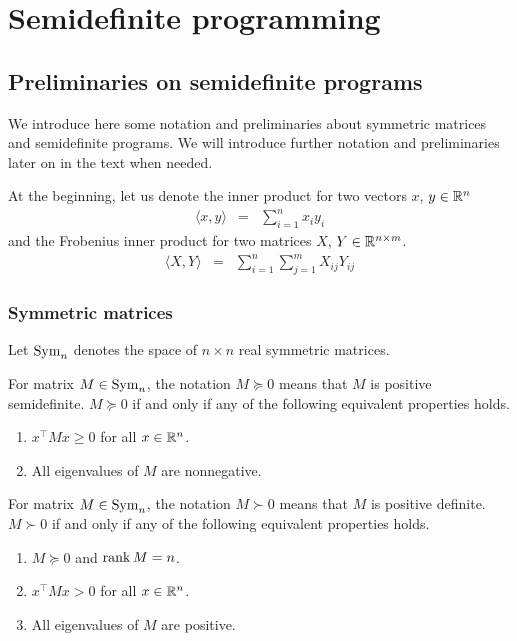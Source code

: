 \chapter{Semidefinite programming}

\section{Preliminaries on semidefinite programs}
We introduce here some notation and preliminaries about symmetric matrices and semidefinite programs.
We will introduce further notation and preliminaries later on in the text when needed.

At the beginning, let us denote the inner product for two vectors $x$, $y \in\mathbb{R}^n$
\begin{eqnarray}
  \langle x, y\rangle &=& \sum_{i=1}^n x_iy_i
\end{eqnarray}
and the Frobenius inner product for two matrices $X$, $Y\in\mathbb{R}^{n\times m}$.
\begin{eqnarray}
  \langle X, Y\rangle &=& \sum_{i=1}^n \sum_{j=1}^m X_{ij}Y_{ij}
\end{eqnarray}

\subsection{Symmetric matrices}
Let $\operatorname{Sym}_n$ denotes the space of $n\times n$ real symmetric matrices.

For matrix $M\in\operatorname{Sym}_n$, the notation $M \succeq 0$ means that $M$ is positive semidefinite.
$M \succeq 0$ if and only if any of the following equivalent properties holds.
\begin{enumerate}
  \item $x^\top Mx \geq 0$ for all $x \in \mathbb{R}^n$.
  \item All eigenvalues of $M$ are nonnegative.
\end{enumerate}

For matrix $M\in\operatorname{Sym}_n$, the notation $M \succ 0$ means that $M$ is positive definite.
$M \succ 0$ if and only if any of the following equivalent properties holds.
\begin{enumerate}
  \item $M \succeq 0$ and $\operatorname{rank} M = n$.
  \item $x^\top Mx > 0$ for all $x \in \mathbb{R}^n$.
  \item All eigenvalues of $M$ are positive.
\end{enumerate}

